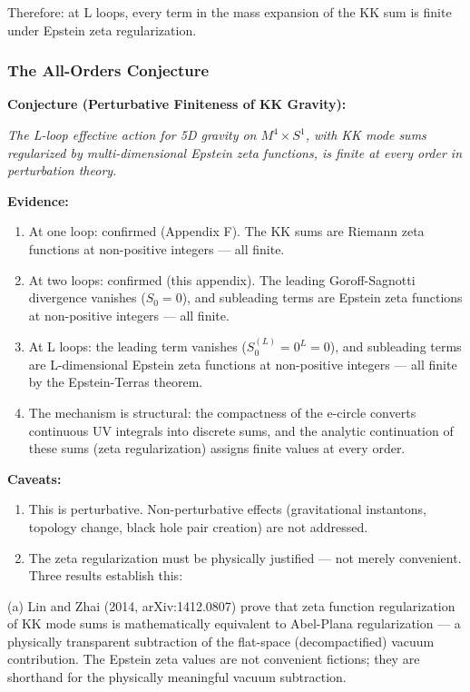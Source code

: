 \documentclass[aps,prd,preprint,superscriptaddress,longbibliography,floatfix]{revtex4-2}
\theoremstyle{remark}
\begin{document}
Therefore: at L loops, every term in the mass expansion of the KK sum is finite under Epstein zeta regularization.


\subsubsection{The All-Orders Conjecture}

\textbf{Conjecture (Perturbative Finiteness of KK Gravity):}

\textit{The L-loop effective action for 5D gravity on $M^{4} \times S^{1}$, with KK mode sums regularized by multi-dimensional Epstein zeta functions, is finite at every order in perturbation theory.}

\textbf{Evidence:}


\begin{enumerate}
  \item At one loop: confirmed (Appendix F). The KK sums are Riemann zeta functions at non-positive integers --- all finite.
  \item At two loops: confirmed (this appendix). The leading Goroff-Sagnotti divergence vanishes ($S_{0} = 0$), and subleading terms are Epstein zeta functions at non-positive integers --- all finite.
  \item At L loops: the leading term vanishes ($S_{0}^{(L)} = 0^L = 0$), and subleading terms are L-dimensional Epstein zeta functions at non-positive integers --- all finite by the Epstein-Terras theorem.
  \item The mechanism is structural: the compactness of the e-circle converts continuous UV integrals into discrete sums, and the analytic continuation of these sums (zeta regularization) assigns finite values at every order.
\end{enumerate}

\textbf{Caveats:}


\begin{enumerate}
  \item This is perturbative. Non-perturbative effects (gravitational instantons, topology change, black hole pair creation) are not addressed.
  \item The zeta regularization must be physically justified --- not merely convenient. Three results establish this:
\end{enumerate}

(a) Lin and Zhai (2014, arXiv:1412.0807) prove that zeta function regularization of KK mode sums is mathematically equivalent to Abel-Plana regularization --- a physically transparent subtraction of the flat-space (decompactified) vacuum contribution. The Epstein zeta values are not convenient fictions; they are shorthand for the physically meaningful vacuum subtraction.
\end{document}
